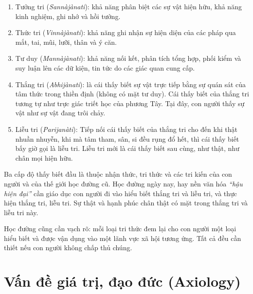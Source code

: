 \begin{enumerate}[label=\itshape\alph*\upshape/]
    \item Tưởng tri (\emph{Sannàjànati}): khả năng phân biệt các sự vật hiện hữu, khả năng kinh nghiệm, ghi nhớ và hồi tưởng.

    \item Thức tri (\emph{Vinnàjànati}): khả năng ghi nhận sự hiện diện của các pháp qua mắt, tai, mũi, lưỡi, thân và ý căn.

    \item Tư duy (\emph{Mannàjànati}): khả năng nối kết, phân tích tổng hợp, phối kiểm và suy luận lên các dữ kiện, tin tức do các giác quan cung cấp.

    \item Thắng tri (\emph{Abhijànati}): là cái thấy biết sự vật trực tiếp bằng sự quán sát của tâm thức trong thiền định (không có mặt tư duy). Cái thấy biết của thắng tri tương tự như trực giác triết học của phương Tây. Tại đây, con người thấy sự vật như sự vật đang trôi chảy.

    \item Liễu tri (\emph{Parijanàti}): Tiếp nối cái thấy biết của thắng tri cho đến khi thật nhuần nhuyễn, khi mà tâm tham, sân, si đều rụng đổ hết, thì cái thấy biết bấy giờ gọi là liễu tri. Liễu tri mới là cái thấy biết sau cùng, như thật, như chân mọi hiện hữu.
\end{enumerate}

Ba cấp độ thấy biết đầu là thuộc nhận thức, tri thức và các tri kiến của con người và của thế giới học đường cũ. Học đường ngày nay, hay nền văn hóa \emph{``hậu hiện đại''} cần giáo dục con người đi vào hiểu biết thắng tri và liễu tri, và thực hiện thắng tri, liễu tri. Sự thật và hạnh phúc chân thật có mặt trong thắng tri và liễu tri này.

Học đường cũng cần vạch rõ: mỗi loại tri thức đem lại cho con người một loại hiểu biết và được vận dụng vào một lãnh vực xã hội tương ứng. Tất cả đều cần thiết nếu con người không chấp thủ chúng.

\section{Vấn đề giá trị, đạo đức (Axiology)} %
\label{sec:van_de_gia_tri_dao_duc}

